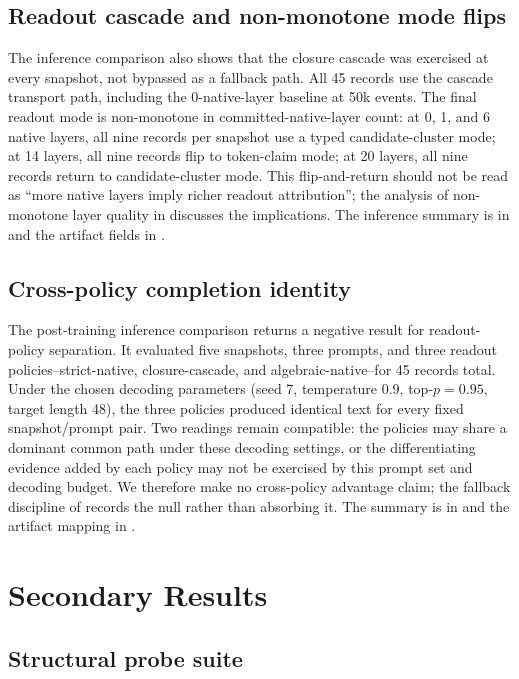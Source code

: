 \documentclass{article}
\theoremstyle{definition}
\begin{document}
\subsection{Readout cascade and non-monotone mode flips}\label{subsec:readout-attribution}

The inference comparison also shows that the closure cascade was exercised at every snapshot, not bypassed as a fallback path. All 45 records use the cascade transport path, including the 0-native-layer baseline at 50k events. The final readout mode is non-monotone in committed-native-layer count: at 0, 1, and 6 native layers, all nine records per snapshot use a typed candidate-cluster mode; at 14 layers, all nine records flip to token-claim mode; at 20 layers, all nine records return to candidate-cluster mode. This flip-and-return should not be read as ``more native layers imply richer readout attribution''; the analysis of non-monotone layer quality in  discusses the implications. The inference summary is in  and the artifact fields in .

\subsection{Cross-policy completion identity}\label{subsec:cross-policy}

The post-training inference comparison returns a negative result for readout-policy separation. It evaluated five snapshots, three prompts, and three readout policies--strict-native, closure-cascade, and algebraic-native--for 45 records total. Under the chosen decoding parameters (seed 7, temperature 0.9, top-\(p=0.95\), target length 48), the three policies produced identical text for every fixed snapshot/prompt pair. Two readings remain compatible: the policies may share a dominant common path under these decoding settings, or the differentiating evidence added by each policy may not be exercised by this prompt set and decoding budget. We therefore make no cross-policy advantage claim; the fallback discipline of  records the null rather than absorbing it. The summary is in  and the artifact mapping in .
 \section{Secondary Results}\label{sec:secondary-results}

\subsection{Structural probe suite}\label{subsec:probe-suite}
\end{document}
